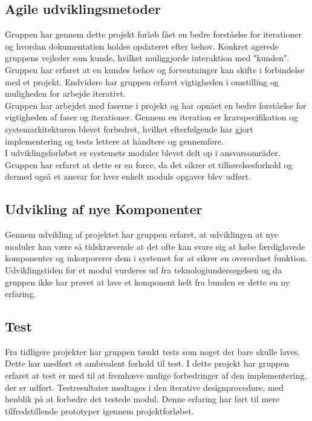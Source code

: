 \subsection{Agile udviklingsmetoder}
Gruppen har gennem dette projekt forløb fået en bedre forståelse for iterationer og hvordan dokumentation holdes opdateret efter behov. Konkret agerede gruppens vejleder som kunde, hvilket muliggjorde interaktion med "kunden". Gruppen har erfaret at en kundes behov og forventninger kan skifte i forbindelse med et projekt. Endvidere har gruppen erfaret vigtigheden i omstilling og muligheden for arbejde iterativt.\\
Gruppen har arbejdet med faserne i projekt og har opnået en bedre forståelse for vigtigheden af faser og iterationer. Gennem en iteration er kravspecifikation og systemarkitekturen blevet forbedret, hvilket efterfølgende har gjort implementering og tests lettere at håndtere og gennemføre.\\
I udviklingsforløbet er systemets moduler blevet delt op i ansvarsområder. Gruppen har erfaret at dette er en force, da det sikrer et tilhørelsesforhold og dermed også et ansvar for hver enkelt moduls opgaver blev udført.

\subsection{Udvikling af nye Komponenter}
Gennem udvikling af projektet har gruppen erfaret, at udviklingen at nye moduler kan være så tidskrævende at det ofte kan svare sig at købe færdiglavede komponenter og inkorporerer dem i systemet for at sikrer en overordnet funktion. Udviklingstiden for et modul vurderes ud fra teknologiundersøgelsen og da gruppen ikke har prøvet at lave et komponent helt fra bunden er dette en ny erfaring.

\subsection{Test}
Fra tidligere projekter har gruppen tænkt tests som noget der bare skulle laves. Dette har medført et ambivalent forhold til test. I dette projekt har gruppen erfaret at test er med til at fremhæve mulige forbedringer af den implementering, der er udført. Testresultater medtages i den iterative designprocedure, med henblik på at forbedre det testede modul. Denne erfaring har ført til mere tilfredstillende prototyper igennem projektforløbet.